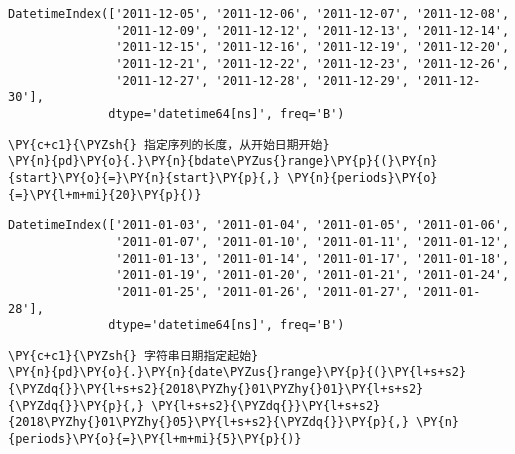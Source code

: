             \begin{tcolorbox}[breakable, size=fbox, boxrule=.5pt, pad at break*=1mm, opacityfill=0]
\begin{Verbatim}[commandchars=\\\{\}]
DatetimeIndex(['2011-12-05', '2011-12-06', '2011-12-07', '2011-12-08',
               '2011-12-09', '2011-12-12', '2011-12-13', '2011-12-14',
               '2011-12-15', '2011-12-16', '2011-12-19', '2011-12-20',
               '2011-12-21', '2011-12-22', '2011-12-23', '2011-12-26',
               '2011-12-27', '2011-12-28', '2011-12-29', '2011-12-30'],
              dtype='datetime64[ns]', freq='B')
\end{Verbatim}
\end{tcolorbox}
        
    \begin{tcolorbox}[breakable, size=fbox, boxrule=1pt, pad at break*=1mm,colback=cellbackground, colframe=cellborder]
\begin{Verbatim}[commandchars=\\\{\}]
\PY{c+c1}{\PYZsh{} 指定序列的长度，从开始日期开始}
\PY{n}{pd}\PY{o}{.}\PY{n}{bdate\PYZus{}range}\PY{p}{(}\PY{n}{start}\PY{o}{=}\PY{n}{start}\PY{p}{,} \PY{n}{periods}\PY{o}{=}\PY{l+m+mi}{20}\PY{p}{)}
\end{Verbatim}
\end{tcolorbox}

            \begin{tcolorbox}[breakable, size=fbox, boxrule=.5pt, pad at break*=1mm, opacityfill=0]
\begin{Verbatim}[commandchars=\\\{\}]
DatetimeIndex(['2011-01-03', '2011-01-04', '2011-01-05', '2011-01-06',
               '2011-01-07', '2011-01-10', '2011-01-11', '2011-01-12',
               '2011-01-13', '2011-01-14', '2011-01-17', '2011-01-18',
               '2011-01-19', '2011-01-20', '2011-01-21', '2011-01-24',
               '2011-01-25', '2011-01-26', '2011-01-27', '2011-01-28'],
              dtype='datetime64[ns]', freq='B')
\end{Verbatim}
\end{tcolorbox}
        
    \begin{tcolorbox}[breakable, size=fbox, boxrule=1pt, pad at break*=1mm,colback=cellbackground, colframe=cellborder]
\begin{Verbatim}[commandchars=\\\{\}]
\PY{c+c1}{\PYZsh{} 字符串日期指定起始}
\PY{n}{pd}\PY{o}{.}\PY{n}{date\PYZus{}range}\PY{p}{(}\PY{l+s+s2}{\PYZdq{}}\PY{l+s+s2}{2018\PYZhy{}01\PYZhy{}01}\PY{l+s+s2}{\PYZdq{}}\PY{p}{,} \PY{l+s+s2}{\PYZdq{}}\PY{l+s+s2}{2018\PYZhy{}01\PYZhy{}05}\PY{l+s+s2}{\PYZdq{}}\PY{p}{,} \PY{n}{periods}\PY{o}{=}\PY{l+m+mi}{5}\PY{p}{)}
\end{Verbatim}
\end{tcolorbox}

